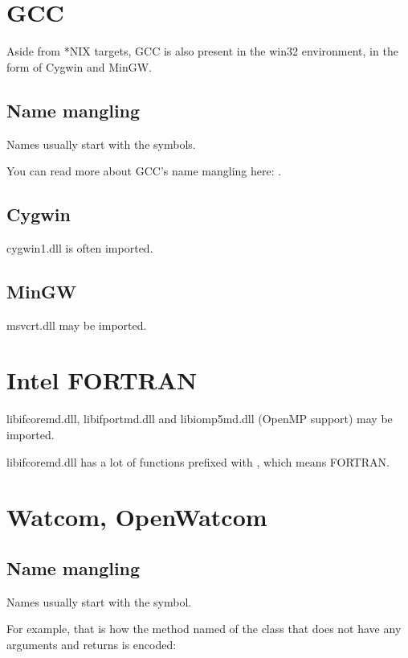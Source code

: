 \section{GCC}

Aside from *NIX targets, GCC is also present in the win32 environment, in the form of Cygwin and MinGW.

\subsection{Name mangling}

Names usually start with the  symbols.

You can read more about GCC's \gls{name mangling} here: .

\subsection{Cygwin}

cygwin1.dll is often imported.

\subsection{MinGW}

msvcrt.dll may be imported.

\section{Intel FORTRAN}

libifcoremd.dll, libifportmd.dll and libiomp5md.dll (OpenMP support) may be imported.

libifcoremd.dll has a lot of functions prefixed with , which means FORTRAN.

\section{Watcom, OpenWatcom}

\subsection{Name mangling}

Names usually start with the  symbol.

For example, that is how the method named  of the class  that does not have any arguments and returns
\Tvoid is encoded:

